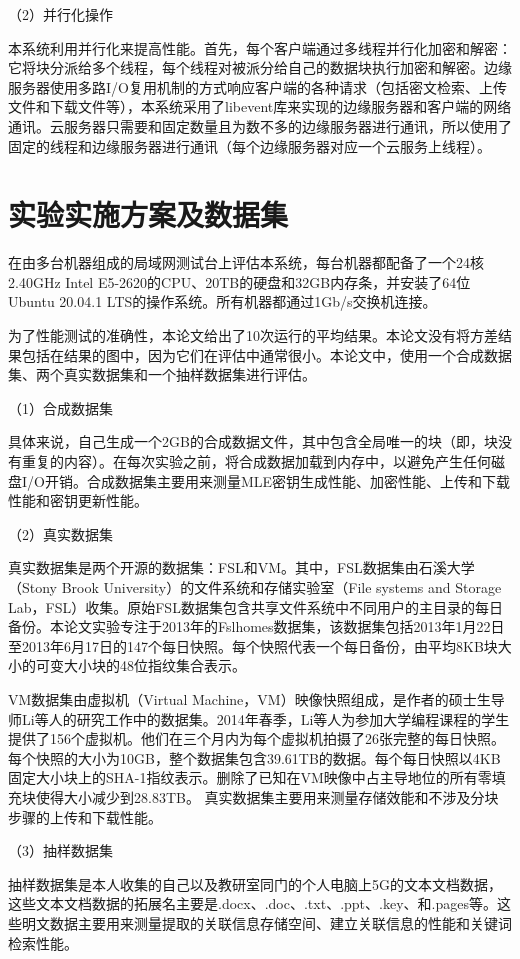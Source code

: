 \documentclass[promaster]{thesis-uestc}
\begin{document}
（2）并行化操作

本系统利用并行化来提高性能。首先，每个客户端通过多线程并行化加密和解密：它将块分派给多个线程，每个线程对被派分给自己的数据块执行加密和解密。边缘服务器使用多路I/O复用机制的方式响应客户端的各种请求（包括密文检索、上传文件和下载文件等），本系统采用了libevent库来实现的边缘服务器和客户端的网络通讯。云服务器只需要和固定数量且为数不多的边缘服务器进行通讯，所以使用了固定的线程和边缘服务器进行通讯（每个边缘服务器对应一个云服务上线程）。

\section{实验实施方案及数据集}
在由多台机器组成的局域网测试台上评估本系统，每台机器都配备了一个24核2.40GHz Intel E5-2620的CPU、20TB的硬盘和32GB内存条，并安装了64位Ubuntu 20.04.1 LTS的操作系统。所有机器都通过1Gb/s交换机连接。

为了性能测试的准确性，本论文给出了10次运行的平均结果。本论文没有将方差结果包括在结果的图中，因为它们在评估中通常很小。本论文中，使用一个合成数据集、两个真实数据集和一个抽样数据集进行评估。

（1）合成数据集

具体来说，自己生成一个2GB的合成数据文件，其中包含全局唯一的块（即，块没有重复的内容）。在每次实验之前，将合成数据加载到内存中，以避免产生任何磁盘I/O开销。合成数据集主要用来测量MLE密钥生成性能、加密性能、上传和下载性能和密钥更新性能。

（2）真实数据集

真实数据集是两个开源的数据集：FSL和VM。其中，FSL数据集由石溪大学（Stony Brook University）的文件系统和存储实验室（File systems and Storage Lab，FSL）收集。原始FSL数据集包含共享文件系统中不同用户的主目录的每日备份。本论文实验专注于2013年的Fslhomes数据集，该数据集包括2013年1月22日至2013年6月17日的147个每日快照。每个快照代表一个每日备份，由平均8KB块大小的可变大小块的48位指纹集合表示。

VM数据集由虚拟机（Virtual Machine，VM）映像快照组成，是作者的硕士生导师Li等人的研究工作中的数据集。2014年春季，Li等人为参加大学编程课程的学生提供了156个虚拟机。他们在三个月内为每个虚拟机拍摄了26张完整的每日快照。每个快照的大小为10GB，整个数据集包含39.61TB的数据。每个每日快照以4KB固定大小块上的SHA-1指纹表示。删除了已知在VM映像中占主导地位的所有零填充块使得大小减少到28.83TB。
真实数据集主要用来测量存储效能和不涉及分块步骤的上传和下载性能。

（3）抽样数据集

抽样数据集是本人收集的自己以及教研室同门的个人电脑上5G的文本文档数据，这些文本文档数据的拓展名主要是.docx、.doc、.txt、.ppt、.key、和.pages等。这些明文数据主要用来测量提取的关联信息存储空间、建立关联信息的性能和关键词检索性能。
\end{document}
